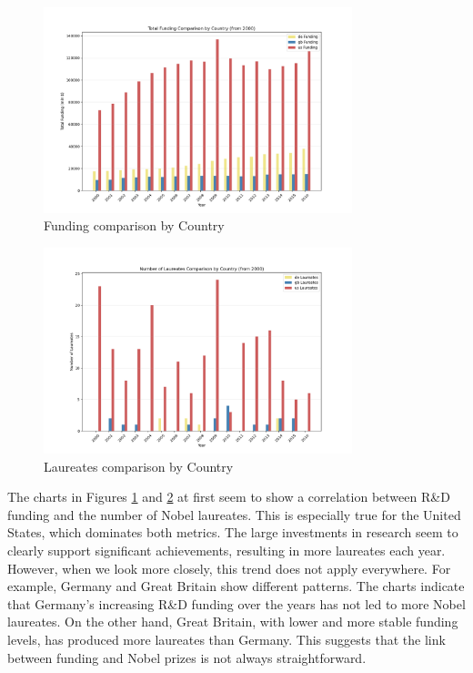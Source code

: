 \documentclass{article}
\begin{document}
\begin{figure}[H]
	\centering
	\includegraphics[width=0.8\textwidth]{../queries/plots/funding_comparison_by_country.png}
	\caption{Funding comparison by Country}
	\label{fig:fundings_per_country}
\end{figure}

\begin{figure}[H]
	\centering
	\includegraphics[width=0.8\textwidth]{../queries/plots/laureates_comparison_by_country.png}
	\caption{Laureates comparison by Country}
	\label{fig:laureates_per_country}
\end{figure}

The charts in Figures \ref{fig:fundings_per_country} and \ref{fig:laureates_per_country} at first seem to show
a correlation between R\&D funding and the number of Nobel laureates. This is especially true for the
United States, which dominates both metrics. The large investments in research seem to clearly support significant
achievements, resulting in more laureates each year. \\

However, when we look more closely, this trend does not apply everywhere. For example, Germany and Great Britain
show different patterns. The charts indicate that Germany's increasing R\&D funding over the years has not led
to more Nobel laureates. On the other hand, Great Britain, with lower and more stable funding levels, has
produced more laureates than Germany. This suggests that the link between funding and Nobel prizes is not always
straightforward. \\
\end{document}
